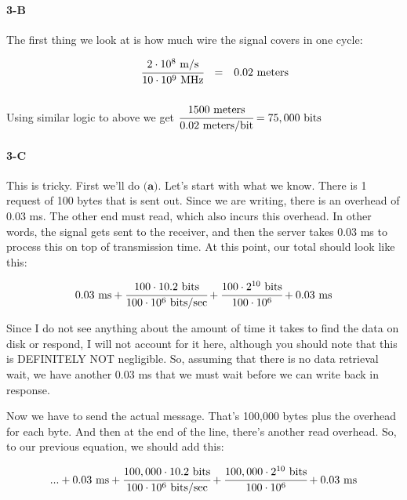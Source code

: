 \documentclass[a4paper]{article}
\begin{document}
\paragraph{3-B} The first thing we look at is how much wire the signal covers in one cycle:

\begin{equation}
\begin{array}{llrll}
& & \cfrac{2 \cdot 10^8 \mbox{ m/s}}{10 \cdot 10^9 \mbox{ MHz}} & = & 0.02 \mbox{ meters} \\[.15in]
\end{array}
\end{equation}

Using similar logic to above we get $\cfrac{1500 \mbox{ meters}}{0.02 \mbox{ meters/bit}} = 75,000 \mbox{ bits}$

\paragraph{3-C} This is tricky. First we'll do $\textbf{(a)}$. Let's start with what we know. There is 1 request of 100 bytes that is sent out. Since we are writing, there is an overhead of 0.03 ms. The other end must read, which also incurs this overhead. In other words, the signal gets sent to the receiver, and then the server takes 0.03 ms to process this on top of transmission time. At this point, our total should look like this:

\begin{equation}
0.03 \mbox{ ms} + \cfrac{100 \cdot 10.2 \mbox{ bits}}{100 \cdot 10^6 \mbox{ bits/sec}} + \cfrac{100 \cdot 2^{10} \mbox{ bits}}{100 \cdot 10^6} + 0.03 \mbox{ ms}
\end{equation}

Since I do not see anything about the amount of time it takes to find the data on disk or respond, I will not account for it here, although you should note that this is DEFINITELY NOT negligible. So, assuming that there is no data retrieval wait, we have another 0.03 ms that we must wait before we can write back in response.

Now we have to send the actual message. That's 100,000 bytes plus the overhead for each byte. And then at the end of the line, there's another read overhead. So, to our previous equation, we should add this:

\begin{equation}
... + 0.03 \mbox{ ms} + \cfrac{100,000 \cdot 10.2 \mbox{ bits}}{100 \cdot 10^6 \mbox{ bits/sec}} + \cfrac{100,000 \cdot 2^{10} \mbox{ bits}}{100 \cdot 10^6} + 0.03 \mbox{ ms}
\end{equation}
\end{document}
